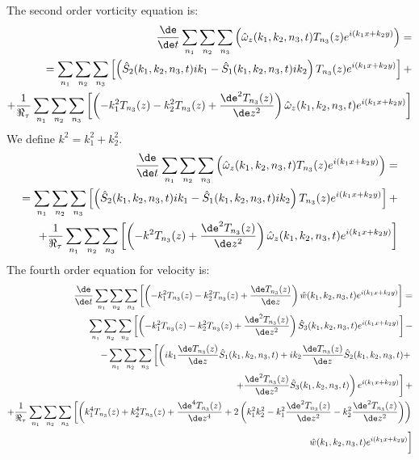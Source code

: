 The second order vorticity equation is:
\[
\begin{split}
\frac{\de}{\de t}\sum_{n_1}\sum_{n_2}\sum_{n_3}\left(\hat\omega_z(k_1,k_2,n_3,t)T_{n_3}(z)e^{i(k_1x+k_2y)}  \right)=\\
=\sum_{n_1}\sum_{n_2}\sum_{n_3}\left[\left(\hat S_2(k_1,k_2,n_3,t)ik_1-\hat S_1(k_1,k_2,n_3,t)ik_2\right)T_{n_3}(z)e^{i(k_1x+k_2y)}  \right]+\\
+\frac{1}{\Re_\tau}\sum_{n_1}\sum_{n_2}\sum_{n_3}\left[\left(-k_1^2T_{n_3}(z)-k_2^2T_{n_3}(z)+\frac{\de^2 T_{n_3}(z)}{\de z^2} \right)\hat\omega_z(k_1,k_2,n_3,t)e^{i(k_1x+k_2y)}  \right]
\end{split}
\]
We define $k^2=k_1^2+k_2^2$.
\begin{equation}
\begin{split}
\frac{\de}{\de t}\sum_{n_1}\sum_{n_2}\sum_{n_3}\left(\hat\omega_z(k_1,k_2,n_3,t)T_{n_3}(z)e^{i(k_1x+k_2y)}  \right)=\\
=\sum_{n_1}\sum_{n_2}\sum_{n_3}\left[\left(\hat S_2(k_1,k_2,n_3,t)ik_1-\hat S_1(k_1,k_2,n_3,t)ik_2\right)T_{n_3}(z)e^{i(k_1x+k_2y)}  \right]+\\
+\frac{1}{\Re_\tau}\sum_{n_1}\sum_{n_2}\sum_{n_3}\left[\left(-k^2T_{n_3}(z)+\frac{\de^2 T_{n_3}(z)}{\de z^2} \right)\hat\omega_z(k_1,k_2,n_3,t)e^{i(k_1x+k_2y)}  \right]
\end{split}
\end{equation}
The fourth order equation for velocity is:
\[
\begin{split}
\frac{\de}{\de t}\sum_{n_1}\sum_{n_2}\sum_{n_3}\left[\left(-k_1^2T_{n_3}(z)-k_2^2T_{n_3}(z)+\frac{\de T_{n_3}(z)}{\de z}\right)\hat w(k_1,k_2,n_3,t)e^{i(k_1x+k_2y)}  \right]=\\
\sum_{n_1}\sum_{n_2}\sum_{n_3}\left[\left(-k_1^2T_{n_3}(z)-k_2^2T_{n_3}(z)+\frac{\de^2 T_{n_3}(z)}{\de z^2}\right)\hat S_3(k_1,k_2,n_3,t)e^{i(k_1x+k_2y)}  \right]-\\
-\sum_{n_1}\sum_{n_2}\sum_{n_3}\left[\left(ik_1\frac{\de T_{n_3}(z)}{\de z}\hat S_1(k_1,k_2,n_3,t)+ik_2\frac{\de T_{n_3}(z)}{\de z}\hat S_2(k_1,k_2,n_3,t)+ \right.\right.\\
\left.\left.+\frac{\de^2 T_{n_3}(z)}{\de z^2}\hat S_3(k_1,k_2,n_3,t)\right)e^{i(k_1x+k_2y)}  \right]+\\
+\frac{1}{\Re_\tau}\sum_{n_1}\sum_{n_2}\sum_{n_3}\left[\left(k_1^4T_{n_3}(z)+k_2^4 T_{n_3}(z)+ \frac{\de^4 T_{n_3}(z)}{\de z^4}+2\left( k_1^2k_2^2-k_1^2\frac{\de^2 T_{n_3}(z)}{\de z^2}-k_2^2\frac{\de^2 T_{n_3}(z)}{\de z^2}\right)\right)\right. \\
\left.\hat w(k_1,k_2,n_3,t)e^{i(k_1x+k_2y)}  \vphantom{\frac{\de^2 T_{n_3}(z)}{\de z^2}}\right]
\end{split}
\]
